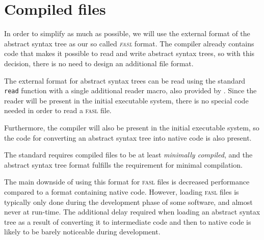 \chapter{Compiled files}
\label{chap-compiled-files}

In order to simplify \sysname{} as much as possible, we will use the
external format of the \cleavir{} abstract syntax tree as our so
called \emph{\textsc{fasl}} format.  The \cleavir{} compiler already contains
code that makes it possible to read and write abstract syntax trees,
so with this decision, there is no need to design an additional file
format.

The external format for abstract syntax trees can be read using the
\commonlisp{} standard \texttt{read} function with a single additional
reader macro, also provided by \cleavir{}.  Since the \commonlisp{}
reader will be present in the initial executable \sysname{} system,
there is no special code needed in order to read a \textsc{fasl} file.

Furthermore, the compiler will also be present in the initial
executable \sysname{} system, so the code for converting an abstract
syntax tree into native code is also present.

The \commonlisp{} standard requires compiled files to be at least
\emph{minimally compiled}, and the abstract syntax tree format
fulfills the requirement for minimal compilation.

The main downside of using this format for \textsc{fasl} files is decreased
performance compared to a format containing native code.  However,
loading \textsc{fasl} files is typically only done during the development phase
of some software, and almost never at run-time.  The additional delay
required when loading an abstract syntax tree as a result of
converting it to intermediate code and then to native code is likely
to be barely noticeable during development.
